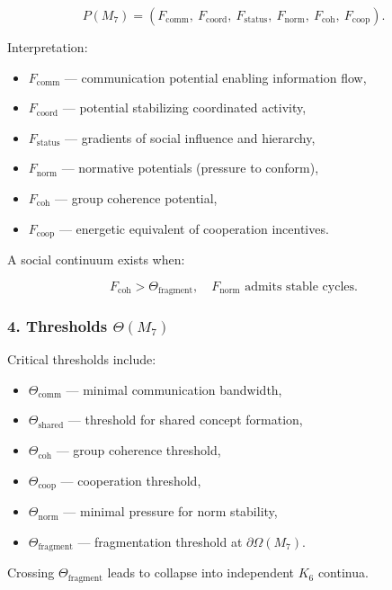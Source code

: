 \[
P(M_7)=
(F_{\mathrm{comm}},\
F_{\mathrm{coord}},\
F_{\mathrm{status}},\
F_{\mathrm{norm}},\
F_{\mathrm{coh}},\
F_{\mathrm{coop}}).
\]

Interpretation:

\begin{itemize}
    \item $F_{\mathrm{comm}}$ — communication potential enabling information flow,
    \item $F_{\mathrm{coord}}$ — potential stabilizing coordinated activity,
    \item $F_{\mathrm{status}}$ — gradients of social influence and hierarchy,
    \item $F_{\mathrm{norm}}$ — normative potentials (pressure to conform),
    \item $F_{\mathrm{coh}}$ — group coherence potential,
    \item $F_{\mathrm{coop}}$ — energetic equivalent of cooperation incentives.
\end{itemize}

A social continuum exists when:

\[
F_{\mathrm{coh}} > \Theta_{\mathrm{fragment}},
\quad F_{\mathrm{norm}} \text{ admits stable cycles}.
\]

\subsubsection*{4. Thresholds \texorpdfstring{$\Theta(M_7)$}{\Theta(M_7)}}

Critical thresholds include:

\begin{itemize}
    \item $\Theta_{\mathrm{comm}}$ — minimal communication bandwidth,
    \item $\Theta_{\mathrm{shared}}$ — threshold for shared concept formation,
    \item $\Theta_{\mathrm{coh}}$ — group coherence threshold,
    \item $\Theta_{\mathrm{coop}}$ — cooperation threshold,
    \item $\Theta_{\mathrm{norm}}$ — minimal pressure for norm stability,
    \item $\Theta_{\mathrm{fragment}}$ — fragmentation threshold at $\partial\Omega(M_7)$.
\end{itemize}

Crossing $\Theta_{\mathrm{fragment}}$ leads to collapse into independent $K_6$ continua.

